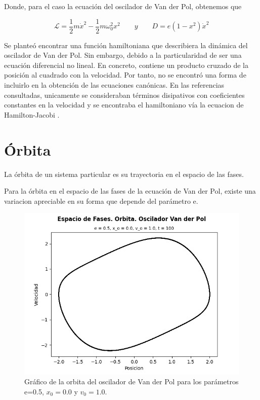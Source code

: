 \documentclass{article}
\begin{document}
	Donde, para el caso la ecuaci\'on del oscilador de Van der Pol, obtenemos que
	
	\begin{equation*}
		\mathcal{L}=\frac{1}{2}m\dot{x}^2-\frac{1}{2}m\omega_0^2x^2 \qquad y \qquad
		D=e(1-x^2)\dot{x}^2
	\end{equation*}
	
	Se plante\'o encontrar una funci\'on hamiltoniana que describiera la din\'amica del oscilador de Van der Pol. Sin embargo, debido a la particularidad de ser una ecuaci\'on diferencial no lineal. En concreto, contiene un producto cruzado de la posición al cuadrado con la velocidad. Por tanto, no se encontr\'o una forma de incluirlo en la obtención de las ecuaciones can\'onicas. En las referencias consultadas, unicamente se consideraban t\'erminos disipativos con coeficientes constantes en la velocidad y se encontraba el hamiltoniano vía la ecuacion de Hamilton-Jacobi \autocite{ola2013}.
	
	\section{\'Orbita}
	
	La \'orbita de un sistema particular es su trayectoria en el espacio de las fases.
	
	Para la \'orbita en el espacio de las fases de la ecuaci\'on de Van der Pol, existe una variacion apreciable en su forma que depende del parámetro e. 
	
	\begin{figure}[h!]
		\centering
		\ContinuedFloat*
		\includegraphics[width=0.7\linewidth]{ESPACIO FASE. ORBITA. e=0.5}
		\caption{Gr\'afico de la orbita del oscilador de Van der Pol para los par\'ametros e=0.5, $x_0=0.0$ y $v_0=1.0$.}
	\end{figure}
	
\end{document}
